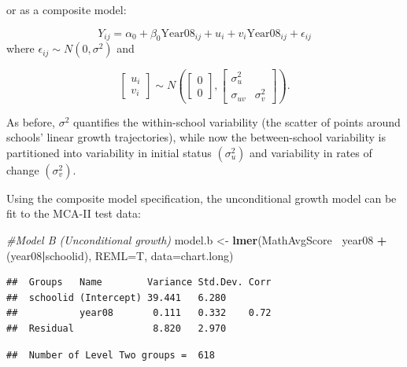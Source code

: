 \documentclass[
]{krantz}
\newenvironment{Shaded}{\begin{snugshade}}{\end{snugshade}}
\newcommand{\CommentTok}[1]{\textcolor[rgb]{0.37,0.37,0.37}{\textit{#1}}}
\newcommand{\DataTypeTok}[1]{\textcolor[rgb]{0.27,0.27,0.27}{#1}}
\newcommand{\KeywordTok}[1]{\textcolor[rgb]{0.27,0.27,0.27}{\textbf{#1}}}
\newcommand{\NormalTok}[1]{#1}
\newcommand{\OperatorTok}[1]{\textcolor[rgb]{0.43,0.43,0.43}{\textbf{#1}}}
\newcommand{\StringTok}[1]{\textcolor[rgb]{0.5,0.5,0.5}{#1}}
\begin{document}
or as a composite model:

\begin{equation*}
Y_{ij}=\alpha_{0} + \beta_{0}\textrm{Year08}_{ij}+u_{i}+v_{i}\textrm{Year08}_{ij} + \epsilon_{ij}
\end{equation*}
where \(\epsilon_{ij}\sim N(0,\sigma^2)\) and

\[ \left[ \begin{array}{c}
            u_{i} \\ v_{i}
          \end{array}  \right] \sim N \left( \left[
          \begin{array}{c}
            0 \\ 0
          \end{array} \right], \left[
          \begin{array}{cc}
            \sigma_{u}^{2} & \\
            \sigma_{uv} & \sigma_{v}^{2}
          \end{array} \right] \right) . \]

As before, \(\sigma^2\) quantifies the within-school variability (the scatter of points around schools' linear growth trajectories), while now the between-school variability is partitioned into variability in initial status \((\sigma^2_u)\) and variability in rates of change \((\sigma^2_v)\).

Using the composite model specification, the unconditional growth model can be fit to the MCA-II test data:

\begin{Shaded}
\begin{Highlighting}[]
\CommentTok{#Model B (Unconditional growth)}
\NormalTok{model.b <-}\StringTok{ }\KeywordTok{lmer}\NormalTok{(MathAvgScore}\OperatorTok{~}\StringTok{ }\NormalTok{year08 }\OperatorTok{+}\StringTok{ }\NormalTok{(year08}\OperatorTok{|}\NormalTok{schoolid), }
  \DataTypeTok{REML=}\NormalTok{T, }\DataTypeTok{data=}\NormalTok{chart.long)}
\end{Highlighting}
\end{Shaded}

\begin{verbatim}
##  Groups   Name        Variance Std.Dev. Corr
##  schoolid (Intercept) 39.441   6.280        
##           year08       0.111   0.332    0.72
##  Residual              8.820   2.970
\end{verbatim}

\begin{verbatim}
##  Number of Level Two groups =  618
\end{verbatim}
\end{document}
